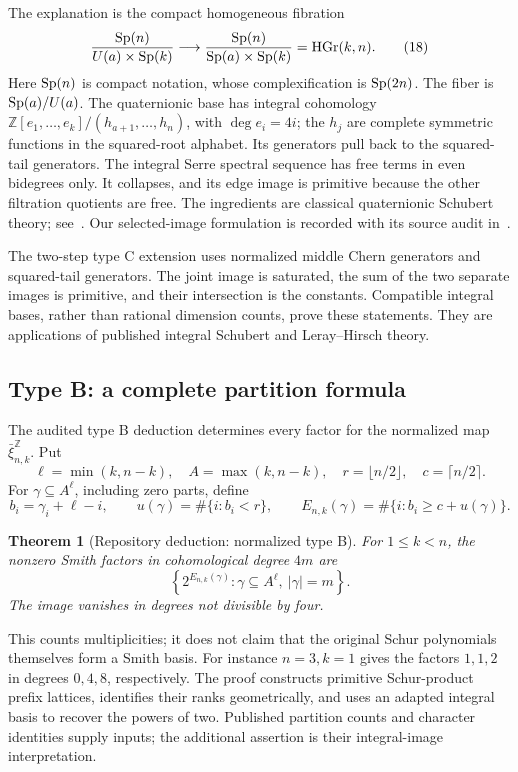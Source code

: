 \documentclass[11pt,letterpaper]{article}
\newcommand{\Z}{\mathbb Z}\newcommand{\Q}{\mathbb Q}\newcommand{\C}{\mathbb C}
\newtheorem{theorem}{Theorem}[section]
\theoremstyle{definition}\newtheorem{definition}[theorem]{Definition}
\begin{document}
The explanation is the compact homogeneous fibration
\[
 \frac{\operatorname{Sp}(n)}{U(a)\times\operatorname{Sp}(k)}
 \longrightarrow
 \frac{\operatorname{Sp}(n)}{\operatorname{Sp}(a)\times\operatorname{Sp}(k)}
       =\operatorname{HGr}(k,n).
 \tag{18}
\]
Here \(\operatorname{Sp}(n)\) is compact notation, whose complexification is
\(\operatorname{Sp}(2n)\). The fiber is \(\operatorname{Sp}(a)/U(a)\).
The quaternionic base has integral cohomology
\(\Z[e_1,\ldots,e_k]/(h_{a+1},\ldots,h_n)\), with \(\deg e_i=4i\);
the \(h_j\) are complete symmetric functions in the squared-root
alphabet. Its generators pull back to the squared-tail generators.
The integral Serre spectral sequence has free terms in even
bidegrees only. It collapses, and its edge image is primitive
because the other filtration quotients are free.
The ingredients are classical quaternionic Schubert theory;
see~\cite{PR,PW}. Our selected-image formulation is recorded with
its source audit in~\cite{Companions}.

The two-step type C extension uses normalized middle Chern generators
and squared-tail generators. The joint image is saturated, the sum
of the two separate images is primitive, and their intersection is
the constants. Compatible integral bases, rather than rational
dimension counts, prove these statements. They are applications of
published integral Schubert and Leray--Hirsch theory.

\subsection{Type B: a complete partition formula}
The audited type B deduction determines every factor for the normalized
map \(\bar\xi_{n,k}^{\Z}\). Put
\[
 \ell=\min(k,n-k),\quad A=\max(k,n-k),\quad
 r=\lfloor n/2\rfloor,\quad c=\lceil n/2\rceil.
\]
For \(\gamma\subseteq A^\ell\), including zero parts, define
\[
 b_i=\gamma_i+\ell-i,\qquad
 u(\gamma)=\#\{i:b_i<r\},\qquad
 E_{n,k}(\gamma)=\#\{i:b_i\ge c+u(\gamma)\}.
 \tag{19}
\]
\begin{theorem}[Repository deduction: normalized type B]
For \(1\le k<n\), the nonzero Smith factors in cohomological degree
\(4m\) are
\[
 \left\{2^{E_{n,k}(\gamma)}:
     \gamma\subseteq A^\ell,\ |\gamma|=m\right\}.
 \tag{20}
\]
The image vanishes in degrees not divisible by four.
\end{theorem}
This counts multiplicities; it does not claim that the original
Schur polynomials themselves form a Smith basis.
For instance \(n=3,k=1\) gives the factors \(1,1,2\) in degrees
\(0,4,8\), respectively. The proof constructs primitive
Schur-product prefix lattices, identifies their ranks geometrically,
and uses an adapted integral basis to recover the powers of two.
Published partition counts and character identities supply inputs;
the additional assertion is their integral-image interpretation.
\end{document}
